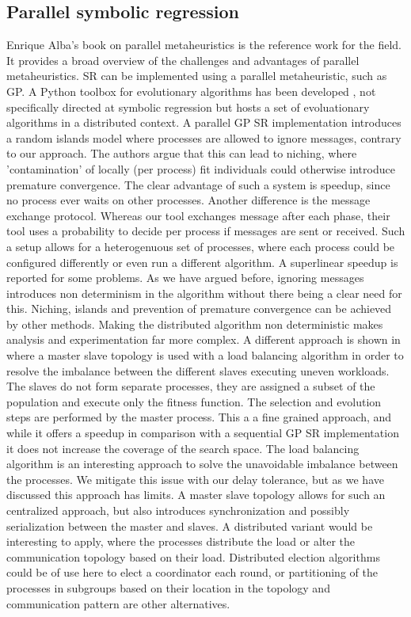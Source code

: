 \subsection{Parallel symbolic regression}
Enrique Alba's book \cite{parallelmetaheuristics} on parallel metaheuristics is the reference work for the field. It provides a broad overview of the challenges and advantages of parallel metaheuristics.  SR can be implemented using a parallel metaheuristic, such as GP.
A Python toolbox for evolutionary algorithms has been developed \citep{DEAP}, not specifically directed at symbolic regression but hosts a set of evoluationary algorithms in a distributed context.
A parallel GP SR implementation \citep{DGPSR} introduces a random islands model where processes are allowed to ignore messages, contrary to our approach. The authors argue that this can lead to niching, where 'contamination' of locally (per process) fit individuals could otherwise introduce premature convergence. The clear advantage of such a system is speedup, since no process ever waits on other processes. Another difference is the message exchange protocol. Whereas our tool exchanges message after each phase, their tool uses a probability to decide per process if messages are sent or received. Such a setup allows for a heterogenuous set of processes, where each process could be configured differently or even run a different algorithm. A superlinear speedup is reported for some problems. As we have argued before, ignoring messages introduces non determinism in the algorithm without there being a clear need for this. Niching, islands and prevention of premature convergence can be achieved by other methods. Making the distributed algorithm non deterministic makes analysis and experimentation far more complex. 
A different approach is shown in \citep{DFGPSR} where a master slave topology is used with a load balancing algorithm in order to resolve the imbalance between the different slaves executing uneven workloads. The slaves do not form separate processes, they are assigned a subset of the population and execute only the fitness function. The selection and evolution steps are performed by the master process. This a a fine grained approach, and while it offers a speedup in comparison with a sequential GP SR implementation it does not increase the coverage of the search space. The load balancing algorithm is an interesting approach to solve the unavoidable imbalance between the processes. We mitigate this issue with our delay tolerance, but as we have discussed this approach has limits. A master slave topology allows for such an centralized approach, but also introduces synchronization and possibly serialization between the master and slaves. A distributed variant would be interesting to apply, where the processes distribute the load or alter the communication topology based on their load. Distributed election algorithms could be of use here to elect a coordinator each round, or partitioning of the processes in subgroups based on their location in the topology and communication pattern are other alternatives.

